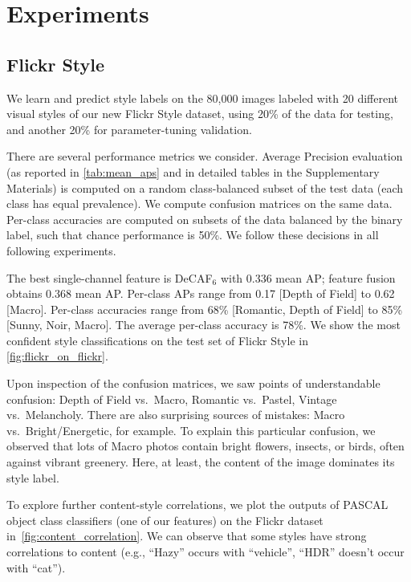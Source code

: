 \section{Experiments}




\subsection{Flickr Style}
We learn and predict style labels on the 80,000 images labeled with 20 different visual styles of our new Flickr Style dataset, using 20\% of the data for testing, and another 20\% for parameter-tuning validation.

There are several performance metrics we consider.
Average Precision evaluation (as reported in \autoref{tab:mean_aps} and in detailed tables in the Supplementary Materials) is computed on a random class-balanced subset of the test data (each class has equal prevalence).
We compute confusion matrices on the same data.
Per-class accuracies are computed on subsets of the data balanced by the binary label, such that chance performance is 50\%.
We follow these decisions in all following experiments.

The best single-channel feature is DeCAF$_6$ with 0.336 mean AP; feature fusion obtains 0.368 mean AP.
Per-class APs range from 0.17 [Depth of Field] to  0.62 [Macro].
Per-class accuracies range from 68\% [Romantic, Depth of Field] to 85\% [Sunny, Noir, Macro].
The average per-class accuracy is 78\%.
We show the most confident style classifications on the test set of Flickr Style in \autoref{fig:flickr_on_flickr}.

Upon inspection of the confusion matrices, we saw points of understandable confusion: Depth of Field vs.~Macro, Romantic vs.~Pastel, Vintage vs.~Melancholy.
There are also surprising sources of mistakes: Macro vs.~Bright/Energetic, for example.
To explain this particular confusion, we observed that lots of Macro photos contain bright flowers, insects, or birds, often against vibrant greenery.
Here, at least, the content of the image dominates its style label.

To explore further content-style correlations, we plot the outputs of PASCAL object class classifiers (one of our features) on the Flickr dataset in~\autoref{fig:content_correlation}.
We can observe that some styles have strong correlations to content (e.g., ``Hazy'' occurs with ``vehicle'', ``HDR'' doesn't occur with ``cat'').

